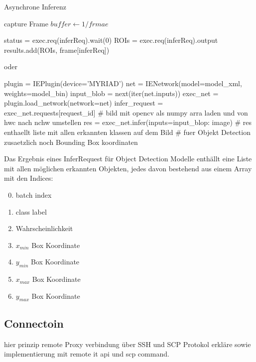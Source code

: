 \begin{algorithm}[H]
    \caption{Asynchrone Inferenz}
    \begin{algorithmic}
        \WHILE{\TRUE}

        \STATE capture Frame
            \STATE $buffer \leftarrow 1 / frmae$
        \ENDIF

        \STATE status = exec.req(inferReq).wait(0)
            \STATE ROIs = exec.req(inferReq).output
            \STATE results.add(ROIs, frame[inferReq])
        \ENDIF

        \ENDFOR

        \ENDWHILE

    \end{algorithmic}
\end{algorithm}

oder




\begin{python}
    plugin = IEPlugin(device='MYRIAD')
    net = IENetwork(model=model_xml, weights=model_bin)
    input_blob = next(iter(net.inputs))
    exec_net = plugin.load_network(network=net)
    infer_request = exec_net.requests[request_id]
    # bild mit opencv als numpy arra laden und von hwc nach nchw umstellen
    res = exec_net.infer(inputs={input_blop: image})
    # res enthaellt liste mit allen erkannten klassen auf dem Bild
    # fuer Objekt Detection zusaetzlich noch Bounding Box koordinaten
\end{python}


Das Ergebnis eines InferRequest für Object Detection Modelle 
enthällt eine Liste mit allen möglichen erkannten Objekten, jedes 
davon bestehend aus einem Array mit den Indices:

\begin{enumerate}
    \setcounter{enumi}{-1}
    \item batch index
    \item class label
    \item Wahrscheinlichkeit
    \item $x_{min}$ Box Koordinate
    \item $y_{min}$ Box Koordinate
    \item $x_{max}$ Box Koordinate
    \item $y_{max}$ Box Koordinate
\end{enumerate}


\subsection*{Connectoin}

hier prinzip remote Proxy verbindung über SSH und SCP Protokol erkläre
sowie implementierung mit remote it api und scp command.



